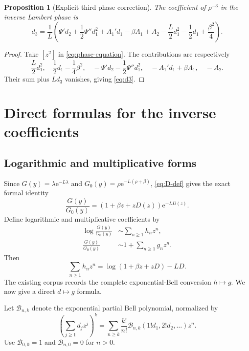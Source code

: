 \documentclass[11pt,oneside]{article}
\numberwithin{equation}{section}
\newtheorem{proposition}[theorem]{Proposition}
\theoremstyle{definition}
\theoremstyle{remark}
\newcommand{\e}{\mathrm e}
\newcommand{\Bell}{\mathcal B}
\begin{document}
\begin{proposition}[Explicit third phase correction]
\label{prop:d3}
The coefficient of $\rho^{-3}$ in the inverse Lambert phase is
\begin{equation}
\boxed{
 d_3=\frac1L\left(
 \Psi'd_2+\frac12\Psi''d_1^2+A_1'd_1-\beta A_1+A_2
 -\frac L2d_1^2-\frac12d_1+\frac{\beta^2}{4}
 \right).}
 \label{eq:d3}
\end{equation}
\end{proposition}

\begin{proof}
Take $[z^2]$ in \eqref{eq:phase-equation}.  The contributions are respectively
\[
 \frac L2d_1^2,
 \quad \frac12d_1-\frac14\beta^2,
 \quad-\Psi'd_2-\frac12\Psi''d_1^2,
 \quad-A_1'd_1+\beta A_1,
 \quad-A_2.
\]
Their sum plus $Ld_3$ vanishes, giving \eqref{eq:d3}.
\end{proof}

\section{Direct formulas for the inverse coefficients}
\label{sec:direct-g}

\subsection{Logarithmic and multiplicative forms}

Since $G(y)=\lambda\e^{-L\lambda}$ and
$G_0(y)=\rho\e^{-L(\rho+\beta)}$, \eqref{eq:D-def} gives the exact formal
identity
\begin{equation}
 \frac{G(y)}{G_0(y)}
 =(1+\beta z+zD(z))\e^{-LD(z)}.
 \label{eq:ratio-factorized}
\end{equation}
Define logarithmic and multiplicative coefficients by
\begin{align}
 \log\frac{G(y)}{G_0(y)}
 &\sim\sum_{n\ge1}h_nz^n,
 \label{eq:h-def}\\
 \frac{G(y)}{G_0(y)}
 &\sim1+\sum_{n\ge1}g_nz^n.
 \label{eq:g-def}
\end{align}
Then
\begin{equation}
 \sum_{n\ge1}h_nz^n
 =\log(1+\beta z+zD)-LD.
 \label{eq:h-generating}
\end{equation}
The existing corpus records the complete exponential-Bell conversion
$h\mapsto g$.  We now give a direct $d\mapsto g$ formula.

Let $\Bell_{n,k}$ denote the exponential partial Bell polynomial, normalized by
\begin{equation}
 \left(\sum_{j\ge1}d_jz^j\right)^k
 =\sum_{n\ge k}\frac{k!}{n!}
 \Bell_{n,k}(1!d_1,2!d_2,\ldots)z^n.
 \label{eq:Bell-normalization}
\end{equation}
Use $\Bell_{0,0}=1$ and $\Bell_{n,0}=0$ for $n>0$.
\end{document}
